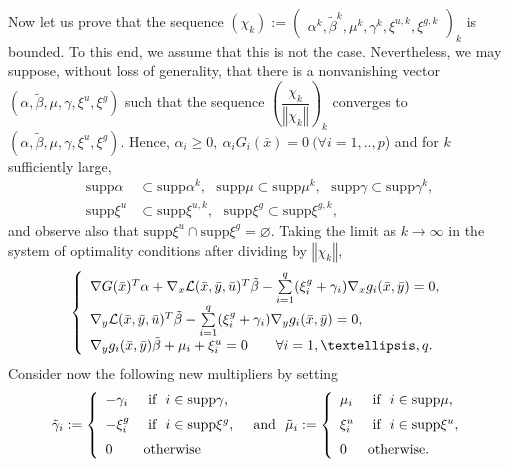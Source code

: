 	 Now let us prove that the sequence
	$(\chi_{k}):=
	\begin{pmatrix}
	\alpha^{k},\tilde{\beta}^{k},\mu^{k},\gamma^{k},\xi^{u,k},\xi^{g,k}
	\end{pmatrix}
	_{k}$ is bounded. To this end, we assume that this is not the case.
	Nevertheless, we may suppose, without loss of generality, that there is a
	nonvanishing vector $(\alpha,\tilde{\beta},\mu,\gamma,\xi^{u},\xi^{g})$ such
	that the sequence $\left(\dfrac{\chi_{k}}{\left\Vert \chi_{k}\right\Vert }\right)_{k}$
	converges to $(\alpha,\tilde{\beta},\mu,\gamma,\xi^{u},\xi^{g})$.
	Hence, $\alpha_{i}\geq0,\ \alpha_{i}G_{i}(\bar{x})=0\ (\forall
	i=1,..,p$) and for $k$ sufficiently large,%
	\begin{align*}
	\mathrm{supp}\alpha & \subset\mathrm{supp}\alpha^{k},\text{ }\mathrm{supp}%
	\mu\subset\mathrm{supp}\mu^{k},\text{ }\mathrm{supp}\gamma\subset
	\mathrm{supp}\gamma^{k},\\[1ex]
	\mathrm{supp}\xi^{u}  & \subset\mathrm{supp}\xi^{u,k},\text{ }\mathrm{supp}%
	\xi^{g}\subset\mathrm{supp}\xi^{g,k},
	\end{align*}
	and observe also that $\mathrm{supp}\xi^{u}\cap\mathrm{supp}\xi^{g}=\varnothing.$
	Taking the limit as $k\rightarrow\infty$ in the system of optimality
	conditions after dividing by $\left\Vert \chi_{k}\right\Vert $,
	\begin{equation}
	\left\{
	\begin{array}
	[c]{l}
	\nabla G(\bar{x})^{T}\alpha+\nabla_{x}\mathcal{L}(\bar{x},\bar{y},\bar{u}%
	)^{T}\tilde{\beta}-\sum\limits_{i=1}^{q}(\xi_{i}^{g}+\gamma_{i})\nabla
	_{x}g_{i}(\bar{x},\bar{y})=0,\\[1ex]
	\nabla_{y}\mathcal{L}(\bar{x},\bar{y},\bar{u})^{T}\tilde{\beta}-\sum
	\limits_{i=1}^{q}(\xi_{i}^{g}+\gamma_{i})\nabla_{y}g_{i}(\bar{x},\bar
	{y})=0,\\[1ex]
	\nabla_{y}g_{i}(\bar{x},\bar{y})\tilde{\beta}+\mu_{i}+\xi_{i}^{u}=0\text{
		\ \ \ \ \ }\forall i=1,\ldots,q.
	\end{array}
	\right. \label{kd19}%
	\end{equation}
	Consider now the following new multipliers by setting%
	\begin{equation}
	\tilde{\gamma}_{i}:=\left\{
	\begin{array}
	[c]{ll}%
	-\gamma_{i} & \mbox{ if }\text{ }i\in\mathrm{supp}\gamma,\medskip\\
	-\xi_{i}^{g} & \mbox{ if }\text{ }i\in\mathrm{supp}\xi^{g},\medskip\\
	0 & \mbox{otherwise}
	\end{array}
	\right.  \text{ \ and \ }\tilde{\mu}_{i}:=\left\{
	\begin{array}
	[c]{ll}
	\mu_{i} & \mbox{ if }\text{ }i\in\mathrm{supp}\mu,\medskip\\
	\xi_{i}^{u} & \mbox{ if }\text{ }i\in\mathrm{supp}\xi^{u},\medskip\\
	0 & \mbox{otherwise}.
	\end{array}
	\right. \label{kd21}
	\end{equation}
